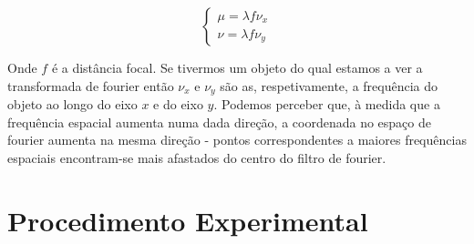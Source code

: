 \documentclass{article}
\begin{document}
\begin{multicols}{2}
\[ \begin{cases}
  \mu = \lambda f \nu_x \\
  \nu = \lambda f \nu_y
\end{cases} \]

Onde $f$ é a distância focal. 
Se tivermos um objeto do qual estamos a ver a transformada de fourier então $\nu_x$ e $\nu_y$ são as, respetivamente, a frequência do objeto ao longo do eixo $x$ e do eixo $y$.
Podemos perceber que, à medida que a frequência espacial aumenta numa dada direção, a coordenada no espaço de fourier aumenta na mesma direção - pontos correspondentes a maiores frequências espaciais encontram-se mais afastados do centro do filtro de fourier.

\section{Procedimento Experimental}

\end{multicols}
\end{document}

